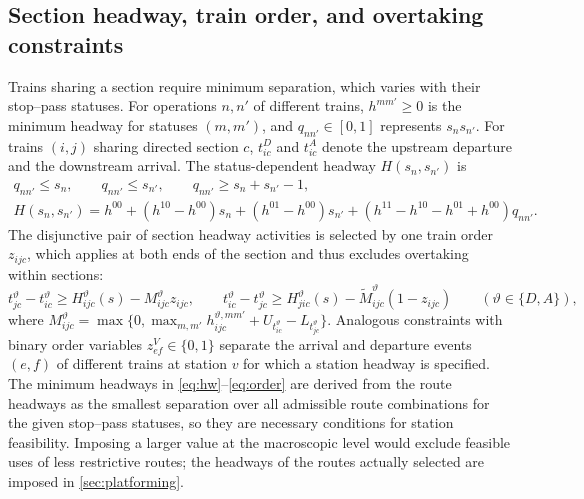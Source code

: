 \subsection{Section headway, train order, and overtaking constraints}\label{sec:headway}
Trains sharing a section require minimum separation, which varies with their stop--pass statuses. For operations $n,n'$ of different trains, $h^{mm'}\ge0$ is the minimum headway for statuses $(m,m')$, and $q_{nn'}\in[0,1]$ represents $s_ns_{n'}$. For trains $(i,j)$ sharing directed section $c$, $t^D_{ic}$ and $t^A_{ic}$ denote the upstream departure and the downstream arrival. The status-dependent headway $H(s_n,s_{n'})$ is
\begin{equation}
\begin{gathered}
q_{nn'}\le s_n,\qquad q_{nn'}\le s_{n'},\qquad q_{nn'}\ge s_n+s_{n'}-1,\\
H(s_n,s_{n'})=h^{00}+(h^{10}-h^{00})s_n+(h^{01}-h^{00})s_{n'}+(h^{11}-h^{10}-h^{01}+h^{00})q_{nn'}.
\end{gathered}\label{eq:hw}
\end{equation}
The disjunctive pair of section headway activities is selected by one train order $z_{ijc}$, which applies at both ends of the section and thus excludes overtaking within sections:
\begin{equation}
t^\vartheta_{jc}-t^\vartheta_{ic}\ge H^\vartheta_{ijc}(s)-M^\vartheta_{ijc}z_{ijc},\qquad
t^\vartheta_{ic}-t^\vartheta_{jc}\ge H^\vartheta_{jic}(s)-\tilde M^\vartheta_{ijc}(1-z_{ijc})\qquad(\vartheta\in\{D,A\}),\label{eq:order}
\end{equation}
where $M^\vartheta_{ijc}=\max\{0,\max_{m,m'}h^{\vartheta,mm'}_{ijc}+U_{t^\vartheta_{ic}}-L_{t^\vartheta_{jc}}\}$. Analogous constraints with binary order variables $z^V_{ef}\in\{0,1\}$ separate the arrival and departure events $(e,f)$ of different trains at station $v$ for which a station headway is specified. The minimum headways in \eqref{eq:hw}--\eqref{eq:order} are derived from the route headways as the smallest separation over all admissible route combinations for the given stop--pass statuses, so they are necessary conditions for station feasibility. Imposing a larger value at the macroscopic level would exclude feasible uses of less restrictive routes; the headways of the routes actually selected are imposed in \cref{sec:platforming}.

